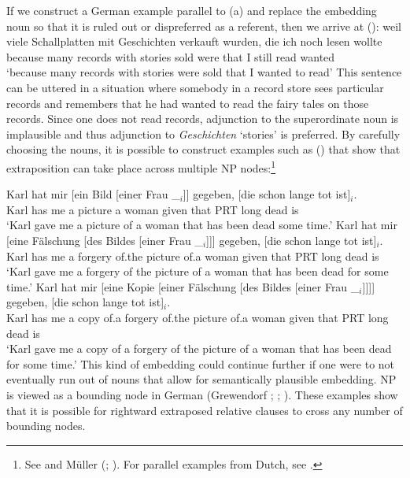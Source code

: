 If we construct a German example parallel to (a) and replace the embedding noun so that it is ruled out or dispreferred as a referent, then we arrive at ():
\ea
\gll weil viele Schallplatten mit Geschichten verkauft wurden, die ich noch lesen wollte\\
	 because many records with stories sold were that I still read wanted\\
\glt `because many records with stories were sold that I wanted to read'
\z
This sentence can be uttered in a situation where somebody in a record store sees particular records and remembers that he had
wanted to read the fairy tales on those records. Since one does not read records, adjunction to the superordinate noun is implausible
and thus adjunction to \emph{Geschichten} `stories' is preferred. By carefully choosing the nouns, it is possible to construct examples such as
() that show that extraposition can take place across multiple NP nodes:\footnote{
  See  and Müller (\citeyear{Mueller2004d};
  \citeyear[Section~3]{Mueller2007c}). For parallel examples from
  Dutch, see .  
}

\largerpage
\eal
\ex 
\gll Karl hat mir [ein Bild [einer Frau \_$_i$]] gegeben, [die schon lange tot ist]$_i$.\\
	 Karl has me  \spacebr{}a picture  \spacebr{}a woman {} given \spacebr{}that PRT long dead is\\
\glt `Karl gave me a picture of a woman that has been dead some time.'
\ex 
\gll Karl hat mir [eine Fälschung [des Bildes [einer Frau \_$_i$]]] gegeben, [die schon lange tot ist]$_i$.\\
	Karl has me \spacebr{}a forgery \spacebr{}of.the picture \spacebr{}of.a woman {} given \spacebr{}that PRT long dead is\\
\glt `Karl gave me a forgery of the picture of a woman that has been dead for some time.'
\ex 
\gll Karl hat mir [eine Kopie [einer Fälschung [des Bildes [einer Frau \_$_i$]]]] gegeben, [die schon lange tot ist]$_i$.\\
	 Karl has me \spacebr{}a copy \spacebr{}of.a forgery \spacebr{}of.the picture \spacebr{}of.a woman {} given \spacebr{}that PRT long dead is\\
\glt `Karl gave me a copy of a forgery of the picture of a woman that has been dead for some time.'
\zl
This kind of embedding could continue further if one were to not eventually run out of nouns that
allow for semantically plausible embedding.
NP is viewed as a bounding node in German (Grewendorf \citeyear[]{Grewendorf88a};
\citeyear[--18]{Grewendorf2002a}; \citealp[]{Haider2001a}). These examples show that it is possible for rightward extraposed relative clauses
to cross any number of bounding nodes.

